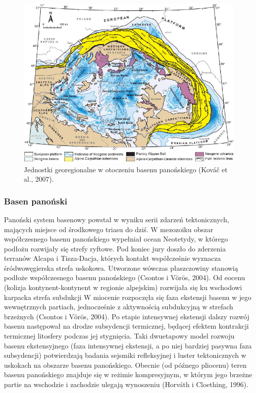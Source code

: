\documentclass[11.5pt,twoside]{report}
\begin{document}
\begin{figure}[h]
	\centering
	\includegraphics[scale=0.7]{"../Termika/kovac et al"}
	\caption{Jednostki georegionalne w otoczeniu basenu panońskiego (Kováč et al., 2007).}
	\label{Fig.}
\end{figure}

\subsubsection{Basen panoński}

Panoński system basenowy powstał w wyniku serii zdarzeń tektonicznych, mających miejsce od środkowego triasu do dziś. W mezozoiku obszar współczesnego basenu panońskiego wypełniał ocean Neotetydy, w którego podłożu rozwijały się strefy ryftowe. Pod koniec jury doszło do zderzenia terranów Alcapa i Tisza-Dacja, których kontakt współcześnie wyznacza śródwowęgierska strefa uskokowa. Utworzone wówczas płaszczowiny stanowią podłoże współczesnego basenu panońskiego (Csontos i V\"{o}r\"{o}s, 2004). Od eocenu (kolizja kontynent-kontynent w regionie alpejskim) rozwijała się ku wschodowi karpacka strefa subdukcji W miocenie rozpoczęła się faza ekstensji basenu w jego wewnętrznych partiach, jednocześnie z aktywnością subdukcyjną w strefach brzeżnych (Csontos i V\"{o}r\"{o}s, 2004). Po etapie intensywnej ekstensji dalszy rozwój basenu następował na drodze subsydencji termicznej, będącej efektem kontrakcji termicznej litosfery podczas jej stygnięcia. Taki dwuetapowy model rozwoju basenu ekstensyjnego (faza intensywnej ekstensji, a po niej bardziej pasywna faza subsydencji) potwierdzają badania sejsmiki refleksyjnej i luster tektonicznych w uskokach na obszarze basenu panońskiego. Obecnie (od pó\'{z}nego pliocenu) teren basenu panońskiego znajduje się w reżimie kompresyjnym, w którym jego brzeżne partie na wschodzie i zachodzie ulegają wynoszeniu (Horv\'{a}th i Cloething, 1996). 
\end{document}
